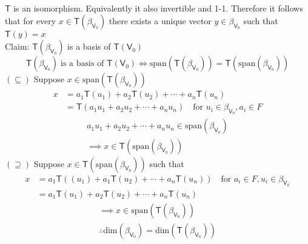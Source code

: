 \begin{enumerate}[(a)]
\paragraph{} $\mathsf{T}$ is an isomorphism. Equivalently it also
invertible and 1-1. Therefore it follows that for every $x\in
\mathsf{T}(\beta_{\mathsf{V}_0})$ there exists a unique vector $y \in
\beta_{\mathsf{V}_0}$ such that $\mathsf{T}(y) =x$
\\Claim: $\mathsf{T}(\beta_{\mathsf{V}_0})$ is a basis of
$\mathsf{T}(\mathsf{V}_0)$
\begin{equation}
\mathsf{T}(\beta_{\mathsf{V}_0})\;\text{is a basis of }
\mathsf{T}(\mathsf{V}_0) \Leftrightarrow
\text{span}(\mathsf{T}(\beta_{\mathsf{V}_0})) = \mathsf{T}(\text{span}(\beta_{\mathsf{V}_0}))
\end{equation}
$(\subseteq)$ Suppose $x \in
\text{span}(\mathsf{T}(\beta_{\mathsf{V}_0}))$
\begin{align}
x &= a_1\mathsf{T}(u_1) + a_2\mathsf{T}(u_2) + \dotsb +
a_n\mathsf{T}(u_n)\\
&= \mathsf{T}(a_1u_1 +a_2u_2 + \dotsb + a_nu_n)\quad \text{for } u_i
\in \beta_{\mathsf{V}_0}, a_i \in F
\end{align}
\begin{gather}
a_1u_1 +a_2u_2 +\dotsb + a_nu_n \in
\text{span}(\beta_{\mathsf{V}_0})\\
\implies x \in \mathsf{T}(\text{span}(\beta_{\mathsf{V}_0}))
\end{gather}
$(\supseteq)$ Suppose $x\in
\mathsf{T}(\text{span}(\beta_{\mathsf{V}_0}))$ such that 
\begin{align}
x &= a_1\mathsf{T}((u_1) + a_1\mathsf{T}(u_2) +\dotsb +
a_n\mathsf{T}(u_n))\quad\text{for }a_i \in F, u_i \in
\beta_{\mathsf{V}_0}\\
&= a_1\mathsf{T}(u_1) + a_2\mathsf{T}(u_2) + \dotsb + a_n\mathsf{T}(u_n)
\end{align}
\begin{gather}
\implies x \in \text{span}(\mathsf{T}(\beta_{\mathsf{V}_0}))\\
\therefore \text{dim}(\beta_{\mathsf{V}_0}) = \text{dim}(\mathsf{T}(\beta_{\mathsf{V}_0}))
\end{gather}
\end{enumerate}
